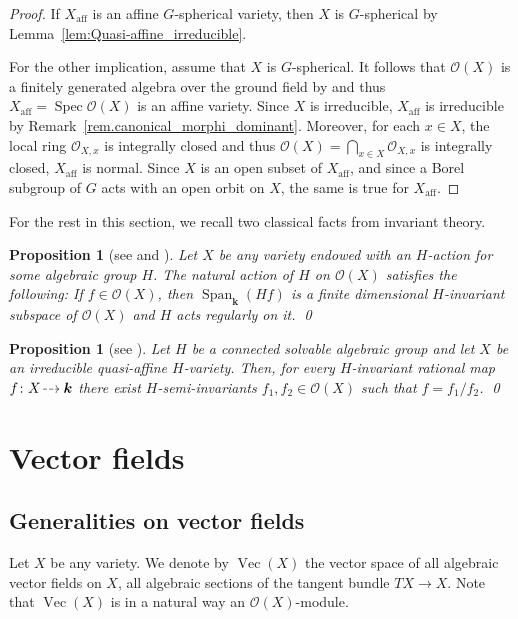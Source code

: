 \documentclass[JEP,XML,SOM,Unicode]{cedram}
\let\mathcal\mathscr
\newcommand{\dradpl}{{\hspace*{-2.5mm}\begin{tikzcd}[ampersand replacement=\&,column sep = scriptsize]\mbox{}\ar[r,dashed]\&\mbox{}\end{tikzcd}\hspace*{-2.5mm}}}
\newcommand{\dratst}{{\hspace*{-2.5mm}\begin{tikzcd}[ampersand replacement=\&,column sep = small]\mbox{}\ar[r,dashed]\&\mbox{}\end{tikzcd}\hspace*{-2mm}}}
\let\drascst\dratst
\newcommand{\dra}{\mathchoice{\dradpl}{\dratst}{\drascst}{\drascst}}
\theoremstyle{plain}
\newtheorem{proposition}[theorem]{Proposition}
\theoremstyle{definition}
\DeclareMathOperator{\Spec}{Spec}
\DeclareMathOperator{\aff}{aff}
\DeclareMathOperator{\Ve}{Vec}
\DeclareMathOperator{\Span}{Span}
\newcommand{\OO}{\mathcal{O}}
\newcommand{\kk}{{\boldsymbol{k}}}
\begin{document}
\begin{proof}
If $X_{\aff}$ is an affine $G$-spherical variety, then $X$ is $G$-spherical by Lemma~\ref{lem:Quasi-affine_irreducible}.

For the other implication,
assume that $X$ is $G$-spherical. It follows that $\OO(X)$ is a
finitely generated algebra over the ground field
by \cite{Kn1993Uber-Hilberts-vier} and thus $X_{\aff} = \Spec \OO(X)$ is an affine variety.
Since $X$ is irreducible, $X_{\aff}$ is irreducible by Remark~\ref{rem.canonical_morphi_dominant}.
Moreover, for each $x \in X$, the local ring $\OO_{X, x}$ is integrally
closed and thus $\OO(X) = \bigcap_{x \in X} \OO_{X, x}$ is integrally closed,
\ie $X_{\aff}$ is normal. Since $X$ is an open subset of $X_{\aff}$,
and since a Borel subgroup of $G$ acts with an open orbit on $X$, the same is true
for $X_{\aff}$.
\end{proof}

For the rest in this section, we recall two classical facts from invariant theory.

\begin{proposition}[{see \cite[Lem.\,1.4, part\,II]{1994Algebraic-geometry} and \cite[\S2.4 Lem.]{Kr1984Geometrische-Metho}}]
\label{prop.locally_finite_and_rational}
Let $X$ be any variety endowed with an $H$-action for some
algebraic group $H$. The natural action of $H$ on $\OO(X)$ satisfies the following:
If $f \in \OO(X)$, then $\Span_{\kk}(Hf)$ is a finite dimensional $H$-invariant subspace
of $\OO(X)$ and $H$ acts regularly on it. \qed
\end{proposition}

\begin{proposition}[{see \cite[Th.\,3.3, part\,II]{1994Algebraic-geometry}}]
\label{prop:H-semi-invariants}
Let $H$ be a connected solvable alge\-braic group and let $X$ be an irreducible
quasi-affine $H$-variety. Then, for every $H$\nobreakdash-inva\-riant rational map
$f \colon X \dra \kk$ there exist $H$-semi-invariants $f_1, f_2 \in \OO(X)$
such that $f = f_1 / f_2$. \qed
\end{proposition}

\section{Vector fields}
\label{sec.vectorfields}

\subsection{Generalities on vector fields}
\label{sec.generalities_on_vectorfields}
Let $X$ be any variety. We denote by
$\Ve(X)$ the vector space of all
algebraic vector fields on $X$, \ie all algebraic sections of the tangent bundle
$T X \to X$. Note that $\Ve(X)$ is in a natural way an $\OO(X)$-module.
\end{document}
